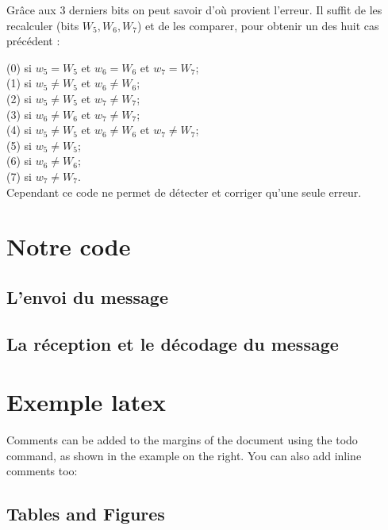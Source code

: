 Grâce aux 3 derniers bits on peut savoir d'où provient l'erreur. Il suffit de les recalculer (bits $W_5, W_6, W_7$) et de les comparer, pour obtenir un des huit cas précédent :

  (0) si $w_5 = W_5$ et $w_6 = W_6$ et $w_7 = W_7$;\\
  (1) si $w_5 \ne W_5$ et $w_6 \ne W_6$; \\
  (2) si $w_5 \ne W_5$ et $w_7 \ne W_7$; \\
  (3) si $w_6 \ne W_6$ et $w_7 \ne W_7$; \\
  (4) si $w_5 \ne W_5$ et $w_6 \ne W_6$ et $w_7 \ne W_7$; \\
  (5) si $w_5 \ne W_5$; \\
  (6) si $w_6 \ne W_6$; \\
  (7) si $w_7 \ne W_7$. \\

Cependant ce code ne permet de détecter et corriger qu'une seule erreur.

\section{Notre code}
\label{sec:Notre code}

\subsection{L'envoi du message}
\label{sub:L'envoi du message}

\subsection{La réception et le décodage du message}
\label{sub:La réception et le décodage du message}



\section{Exemple latex}
\label{sec:Exemple latex}


Comments can be added to the margins of the document using the  todo command, as shown in the example on the right. You can also add inline comments too:


\subsection{Tables and Figures}

